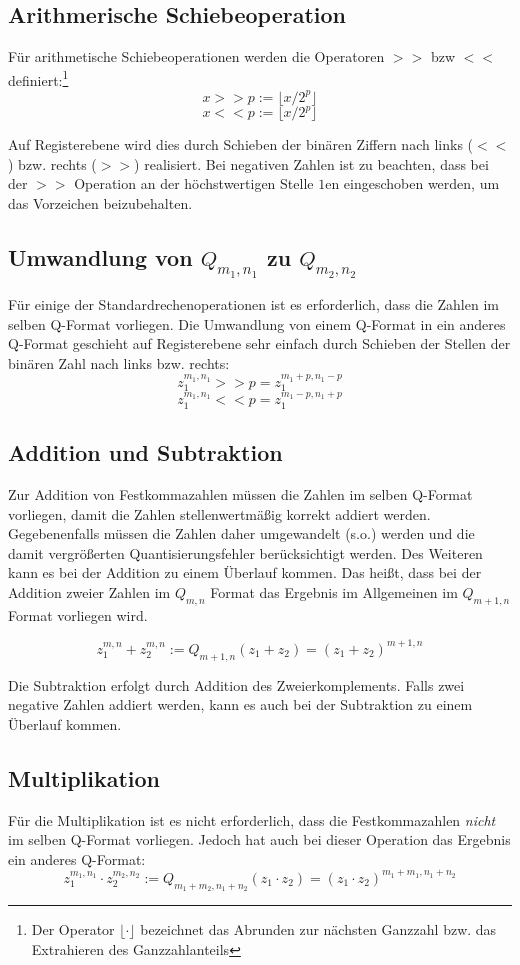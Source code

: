 \subsection{Arithmerische Schiebeoperation}
Für arithmetische Schiebeoperationen werden die Operatoren $>>$ bzw $<<$ definiert:\footnote{Der Operator $\lfloor \cdot \rfloor$ bezeichnet das Abrunden zur nächsten Ganzzahl bzw. das Extrahieren des Ganzzahlanteils}
\[x >> p := \lfloor x/2^p \rfloor\]
\[x << p := \lfloor x/2^p \rfloor\]

Auf Registerebene wird dies durch Schieben der binären Ziffern nach links ($<<$) bzw. rechts ($>>$) realisiert. Bei negativen Zahlen ist zu beachten, dass bei der $>>$ Operation an der höchstwertigen Stelle $1$en eingeschoben werden, um das Vorzeichen beizubehalten.

\subsection{Umwandlung von \texorpdfstring{$Q_{m_1,n_1}$ zu  $Q_{m_2,n_2}$}{Qm1.n1 zu Qm2.n2}}
Für einige der Standardrechenoperationen ist es erforderlich, dass die Zahlen im selben Q-Format vorliegen. Die Umwandlung von einem Q-Format in ein anderes Q-Format geschieht auf Registerebene sehr einfach durch Schieben der Stellen der binären Zahl nach links bzw. rechts:
\[z_1^{m_1,n_1} >> p = z_1^{m_1+p,n_1-p}\]
\[z_1^{m_1,n_1} << p = z_1^{m_1-p,n_1+p}\]

\subsection{Addition und Subtraktion}
Zur Addition von Festkommazahlen müssen die Zahlen im selben Q-Format vorliegen, damit die Zahlen stellenwertmäßig korrekt addiert werden. Gegebenenfalls müssen die Zahlen daher umgewandelt (s.o.) werden und die damit vergrößerten Quantisierungsfehler berücksichtigt werden. Des Weiteren kann es bei der Addition zu einem Überlauf kommen. Das heißt, dass bei der Addition zweier Zahlen im $Q_{m,n}$ Format das Ergebnis im Allgemeinen im $Q_{m+1,n}$ Format vorliegen wird.

\[z_1^{m,n}+z_2^{m,n} := Q_{m+1,n}(z_1+z_2) = (z_1+z_2)^{m+1,n}\]

Die Subtraktion erfolgt durch Addition des Zweierkomplements. Falls zwei negative Zahlen addiert werden, kann es auch bei der Subtraktion zu einem Überlauf kommen.

\subsection{Multiplikation}
Für die Multiplikation ist es nicht erforderlich, dass die Festkommazahlen \emph{nicht} im selben Q-Format vorliegen. Jedoch hat auch bei dieser Operation das Ergebnis ein anderes Q-Format:
\[z_1^{m_1,n_1}\cdot z_2^{m_2,n_2} := Q_{m_1+m_2,n_1+n_2}(z_1\cdot z_2) = (z_1\cdot z_2)^{m_1+m_1,n_1+n_2}\]

